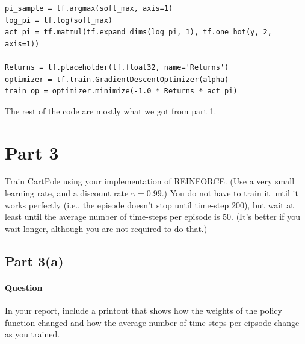 \documentclass[11pt,twoside]{article}
\begin{document}
\begin{enumerate}
\begin{lstlisting}
pi_sample = tf.argmax(soft_max, axis=1)
log_pi = tf.log(soft_max)
act_pi = tf.matmul(tf.expand_dims(log_pi, 1), tf.one_hot(y, 2, axis=1))

Returns = tf.placeholder(tf.float32, name='Returns')
optimizer = tf.train.GradientDescentOptimizer(alpha)
train_op = optimizer.minimize(-1.0 * Returns * act_pi)
\end{lstlisting}

The rest of the code are mostly what we got from part 1.

\end{enumerate}

\clearpage



\section*{Part 3}
Train CartPole using your implementation of REINFORCE. (Use a very small learning rate, and a discount rate $\gamma=0.99$.) You do not have to train it until it works perfectly (i.e., the episode doesn’t stop until time-step 200), but wait at least until the average number of time-steps per episode is 50. (It’s better if you wait longer, although you are not required to do that.)

\subsection*{Part 3(a)}
\paragraph{Question}
In your report, include a printout that shows how the weights of the policy function changed and how the average number of time-steps per eipsode change as you trained.
\end{document}
